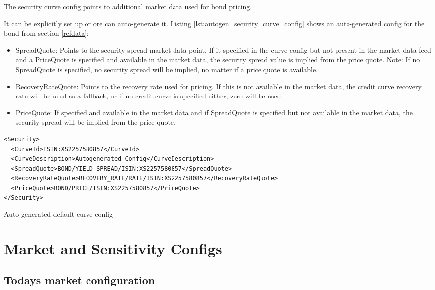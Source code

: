 \documentclass[12pt, a4paper]{article}
\begin{document}
The security curve config points to additional market data used for bond pricing.

It can be explicitly set up or ore can auto-generate it. Listing \ref{lst:autogen_security_curve_config} shows an
auto-generated config for the bond from section \ref{refdata}:

\begin{itemize}
\item SpreadQuote: Points to the security spread market data point. If it specified in the curve config but not present
  in the market data feed and a PriceQuote is specified and available in the market data, the security spread value is
  implied from the price quote. Note: If no SpreadQuote is specified, no security spread will be implied, no matter if a
  price quote is available.
\item RecoveryRateQuote: Points to the recovery rate used for pricing. If this is not available in the market data, the
  credit curve recovery rate will be used as a fallback, or if no credit curve is specified either, zero will be used.
\item PriceQuote: If specified and available in the market data and if SpreadQuote is specified but not available in the
  market data, the security spread will be implied from the price quote.
\end{itemize}

\begin{listing}[H]
\begin{verbatim}
<Security>
  <CurveId>ISIN:XS2257580857</CurveId>
  <CurveDescription>Autogenerated Config</CurveDescription>
  <SpreadQuote>BOND/YIELD_SPREAD/ISIN:XS2257580857</SpreadQuote>
  <RecoveryRateQuote>RECOVERY_RATE/RATE/ISIN:XS2257580857</RecoveryRateQuote>
  <PriceQuote>BOND/PRICE/ISIN:XS2257580857</PriceQuote>
</Security>
\end{verbatim}
\caption{Auto-generated default curve config}
\label{lst:autogen_security_curve_config}
\end{listing}

\section{Market and Sensitivity Configs}\label{curveconfigs}

\subsection{Todays market configuration}\label{t0_config}
\end{document}

